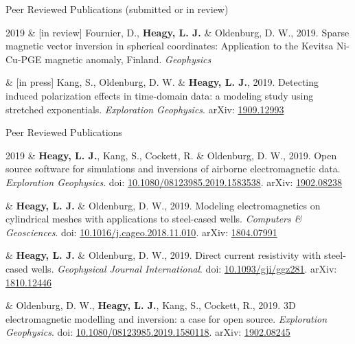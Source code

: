 \documentclass[a4paper, 11pt]{article}
\newcommand{\arxiv}[1]{arXiv: \href{https://arxiv.org/abs/#1}{#1}}
\newcommand{\doi}[1]{doi: \href{https://doi.org/#1}{#1}}
\newcommand{\subheading}[1]{
    \vspace{0.4cm}
    {\Large #1}\\
    \vspace{-0.2cm}
}
\begin{document}
% 
% 

\subheading{Peer Reviewed Publications (submitted or in review)}

\begin{entryright}
2019 & [in review] Fournier, D., \textbf{Heagy, L. J.} \& Oldenburg, D. W., 2019. Sparse magnetic vector inversion in spherical coordinates: Application to the Kevitsa Ni-Cu-PGE magnetic anomaly, Finland. \emph{Geophysics}
\end{entryright}

\begin{entryright}
& [in press] Kang, S., Oldenburg, D. W. \& \textbf{Heagy, L. J.}, 2019. Detecting induced polarization effects in time-domain data: a modeling study using stretched exponentials. \emph{Exploration Geophysics}. \arxiv{1909.12993}
\end{entryright}


\subheading{Peer Reviewed Publications}

\begin{entryright}
2019 & \textbf{Heagy, L. J.}, Kang, S., Cockett, R. \& Oldenburg, D. W., 2019. Open source software for simulations and inversions of airborne electromagnetic data. \emph{Exploration Geophysics}. \doi{10.1080/08123985.2019.1583538}. \arxiv{1902.08238}
\end{entryright}

\begin{entryright}
& \textbf{Heagy, L. J.} \& Oldenburg, D. W., 2019. Modeling electromagnetics on cylindrical meshes with applications to steel-cased wells. \emph{Computers \& Geosciences}. \doi{10.1016/j.cageo.2018.11.010}. \arxiv{1804.07991}
\end{entryright}

\begin{entryright}
& \textbf{Heagy, L. J.} \& Oldenburg, D. W., 2019. Direct current resistivity with steel-cased wells. \emph{Geophysical Journal International}. \doi{10.1093/gji/ggz281}. \arxiv{1810.12446}
\end{entryright}

\begin{entryright}
& Oldenburg, D. W., \textbf{Heagy, L. J.}, Kang, S., Cockett, R., 2019. 3D electromagnetic modelling and inversion: a case for open source. \emph{Exploration Geophysics}. \doi{10.1080/08123985.2019.1580118}. \arxiv{1902.08245}
\end{entryright}
\end{document}
